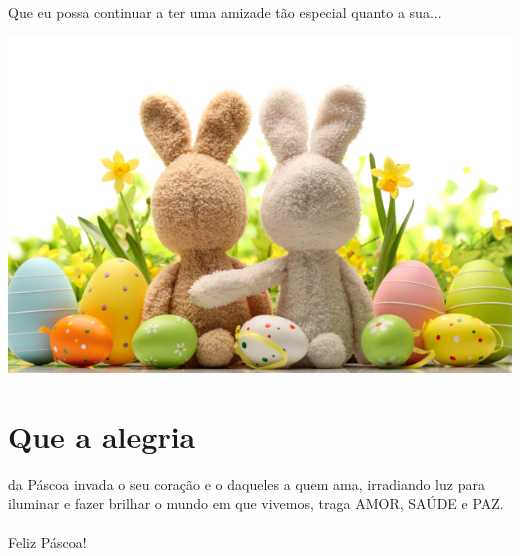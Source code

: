 \documentclass[a4paper,10pt]{article}
\begin{document}
  \begin{frontcover}
    \begin{center}
      {\LARGE \color{red} %
      {\calligra Que eu possa continuar a ter uma amizade tão especial quanto a sua...}}
    \end{center}
  \end{frontcover}

  \begin{insideleft}
  \end{insideleft}

  \begin{insideright}
  	\includegraphics[width=1.0\textwidth]{pascoa.png}
    \section*{Que a alegria}
    da Páscoa invada o seu coração e o daqueles a quem ama, 
    irradiando luz para iluminar e fazer brilhar o mundo em que vivemos, 
    traga AMOR, SAÚDE e PAZ. \\
    {\LARGE \color{red}\\ %
    {\calligra Feliz Páscoa!}}
  \end{insideright}
\end{document}
